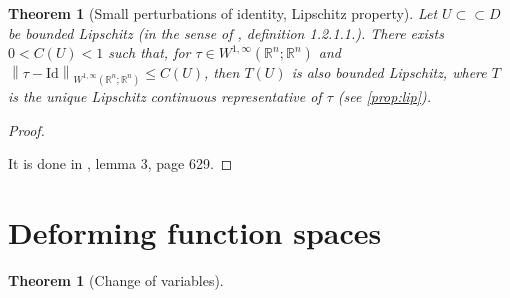 \documentclass[english,a4paper,10pt,oneside]{scrbook}	%
\theoremstyle{break}
\newtheorem{thm}[equation]{Theorem}
\newtheorem{prop}[equation]{Proposition}
\newenvironment{mproof}[1][\proofname]{%
  \begin{proof}[#1]$ $\par\nobreak\ignorespaces
}{%
  \end{proof}
}
\renewcommand*{\proofname}{Proof}
\theoremstyle{remark}
\newcommand{\mR}{\mathbb{R}}
\newcommand{\norm}[1]{\left\lVert#1\right\rVert}
\newcommand{\cc}{\subset\subset}
\newcommand{\cT}{\pazocal{T}}
\newcommand{\id}{\text{Id}}
\newcommand{\te}{\theta}
\newcommand{\Te}{\Theta}
\begin{document}
\begin{appendices}
\begin{thm}[Small perturbations of identity, Lipschitz property]
\label{thm:ptb_id_lip}
Let $U\cc D$ be bounded Lipschitz (in the sense of \cite{grisvard}, definition 1.2.1.1.). There exists $0<C(U)<1$ such that, for $\tau \in W^{1,\infty}(\mR^n;\mR^n)$ and $\norm{\tau - \id}_{W^{1,\infty}(\mR^n;\mR^n)}\leq C(U)$, then $T(U)$ is also bounded Lipschitz, where $T$ is the unique Lipschitz continuous representative of $\tau$ (see \cref{prop:lip}).

\end{thm}

\begin{mproof}
It is done in \cite{bello}, lemma 3, page 629.
\end{mproof}



%
%
%
%
%
%
%
%
%
%
%

\section{Deforming function spaces}

\begin{thm}[Change of variables]
\label{thm:change}


\end{thm}
\end{appendices}
\end{document}
